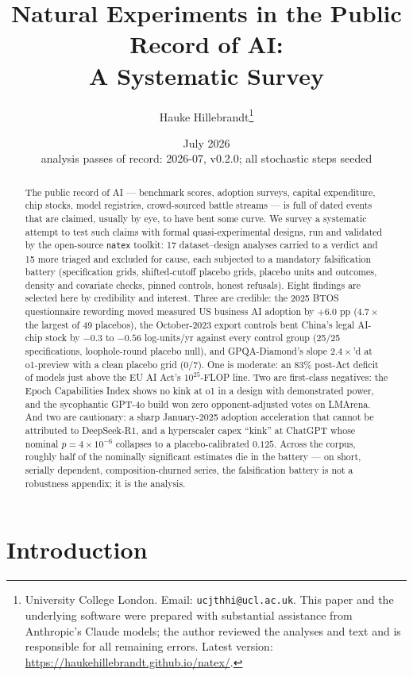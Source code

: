\documentclass[11pt]{article}
\title{Natural Experiments in the Public Record of AI:\\ A Systematic Survey}
\author{Hauke Hillebrandt\thanks{University College London. Email:
\texttt{ucjthhi@ucl.ac.uk}. This paper and the underlying \natex{} software were
prepared with substantial assistance from Anthropic's Claude models; the author
reviewed the analyses and text and is responsible for all remaining errors.
Latest version: \url{https://haukehillebrandt.github.io/natex/}.}}
\date{July 2026 \\ \small analysis passes of record: 2026-07, \natex{} v0.2.0;
all stochastic steps seeded}
\newcommand{\natex}{\texttt{natex}}
\begin{document}
\maketitle

\begin{abstract}
\noindent The public record of AI --- benchmark scores, adoption surveys,
capital expenditure, chip stocks, model registries, crowd-sourced battle
streams --- is full of dated events that are claimed, usually by eye, to have
bent some curve. We survey a systematic attempt to test such claims with
formal quasi-experimental designs, run and validated by the open-source
\natex{} toolkit: 17 dataset--design analyses carried to a verdict and 15
more triaged and excluded for cause, each subjected to a mandatory
falsification battery (specification grids, shifted-cutoff placebo grids,
placebo units and outcomes, density and covariate checks, pinned controls,
honest refusals). Eight findings are selected here by credibility and
interest. Three are credible: the 2025 BTOS questionnaire rewording moved
measured US business AI adoption by $+6.0$ pp ($4.7\times$ the largest of 49
placebos), the October-2023 export controls bent China's legal AI-chip stock
by $-0.3$ to $-0.56$ log-units/yr against every control group (25/25
specifications, loophole-round placebo null), and GPQA-Diamond's slope
$2.4\times$'d at o1-preview with a clean placebo grid (0/7). One is moderate:
an 83\% post-Act deficit of models just above the EU AI Act's
$10^{25}$-FLOP line. Two are first-class negatives: the Epoch Capabilities
Index shows no kink at o1 in a design with demonstrated power, and the
sycophantic GPT-4o build won zero opponent-adjusted votes on LMArena. And two
are cautionary: a sharp January-2025 adoption acceleration that cannot be
attributed to DeepSeek-R1, and a hyperscaler capex ``kink'' at ChatGPT whose
nominal $p = 4\times10^{-6}$ collapses to a placebo-calibrated $0.125$. Across
the corpus, roughly half of the nominally significant estimates die in the
battery --- on short, serially dependent, composition-churned series, the
falsification battery is not a robustness appendix; it is the analysis.
\end{abstract}

\section{Introduction}\label{sec:intro}
\end{document}
